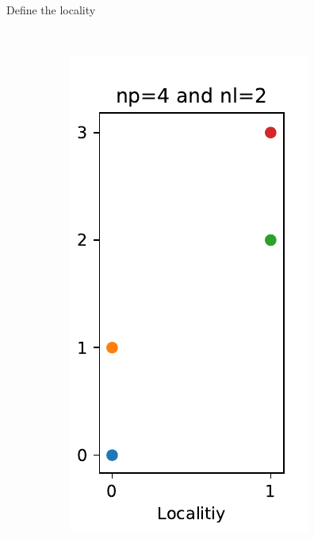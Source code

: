 \documentclass[12pt,t]{beamer}
\begin{document}
\begin{frame}[fragile]{Define the locality}
\begin{figure}
\begin{subfigure}[b]{0.3\textwidth}
    \end{subfigure}
    ~ %
    \begin{subfigure}[b]{0.3\textwidth}
        \includegraphics[width=\textwidth]{./images/partition1}

\end{subfigure}
\end{figure}
\end{frame}
\end{document}
